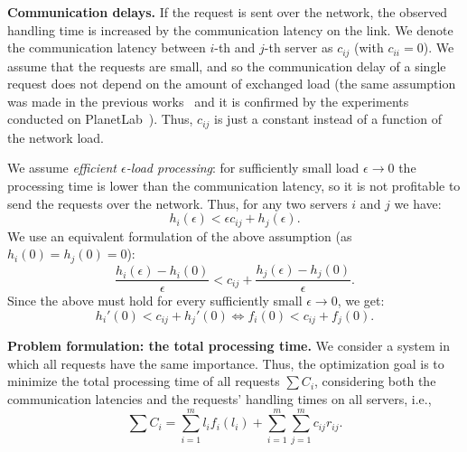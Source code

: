 \documentclass[11pt]{article}
\begin{document}
\noindent
\textbf{Communication delays.}\quad
If the request is sent over the network, the observed handling time is increased by the communication latency on the link.
We denote the communication latency between $i$-th and $j$-th server as $c_{ij}$ (with $c_{ii}=0$). 
We assume that the requests are small, and so the communication delay of a single request does not depend on the amount of exchanged load (the same assumption was made in the previous works~\cite{Penmatsa:2006:CLB:1898953.1899089, Liu:2011:GGL:1993744.1993767, Skowron:2013:NDL:2510648.2510769, Grosu:2008:CLB:1455689.1455695, gallet09divisibleload, beaumont2005scheduling, veeravalli2002efficient, drozdowski2008scheduling} and it is confirmed by the experiments conducted on PlanetLab~\cite{Skowron:2013:NDL:2510648.2510769}). Thus, $c_{ij}$ is just a constant instead of a function of the network load.

We assume \emph{efficient $\epsilon$-load processing}: for sufficiently small load $\epsilon \to 0$ the processing time is lower than the communication latency, 
so it is not profitable to send the requests over the network. 
Thus, for any two servers $i$ and $j$ we have:
\begin{equation}
h_i(\epsilon) < \epsilon c_{ij} + h_j(\epsilon) \text{.}
\end{equation}
We use an equivalent formulation of the above assumption (as $h_i(0) = h_j(0) = 0$):
\begin{equation}
\frac{h_i(\epsilon) - h_i(0)}{\epsilon} < c_{ij} + \frac{h_j(\epsilon) - h_j(0)}{\epsilon} \text{.}
\end{equation}
Since the above must hold for every sufficiently small $\epsilon \to 0$, we get:
\begin{equation}
h_i'(0) < c_{ij} + h_j'(0) \Leftrightarrow f_i(0) < c_{ij} + f_j(0) \text{.}
\end{equation}


\medskip

\noindent
\textbf{Problem formulation: the total processing time.}\quad
We consider a system in which all requests have the same importance. Thus, 
the optimization goal is to minimize the total processing time of all requests $\sum C_i$, considering both the communication latencies and the requests' handling times on all servers, i.e., 
\begin{equation}
\sum{C_{i}} = \sum_{i = 1}^{m}l_{i}f_{i}(l_i) + \sum_{i = 1}^{m}\sum_{j = 1}^{m}c_{ij}r_{ij}\textrm{.}
\end{equation}
\medskip
\end{document}
